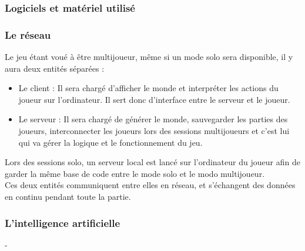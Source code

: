 \documentclass{article}
\begin{document}
\subsubsection{Logiciels et matériel utilisé}
\subsubsection{Le réseau}
Le jeu étant voué à être multijoueur, même si un mode solo sera disponible, il y aura deux entités séparées :
\begin{itemize}
    \item Le client :  Il sera chargé d'afficher le monde et interpréter les actions du joueur sur l'ordinateur. Il sert donc d'interface entre le serveur et le joueur.
    \item Le serveur : Il sera chargé de générer le monde, sauvegarder les parties des joueurs, interconnecter les joueurs lors des sessions multijoueurs et c'est lui qui va gérer la logique et le fonctionnement du jeu.
\end{itemize}
Lors des sessions solo, un serveur local est lancé sur l'ordinateur du joueur afin de garder la même base de code entre le mode solo et le modo multijoueur. \\
Ces deux entités communiquent entre elles en réseau,  et s'échangent des données en continu pendant toute la partie.
\subsubsection{L'intelligence artificielle}
-
\end{document}
